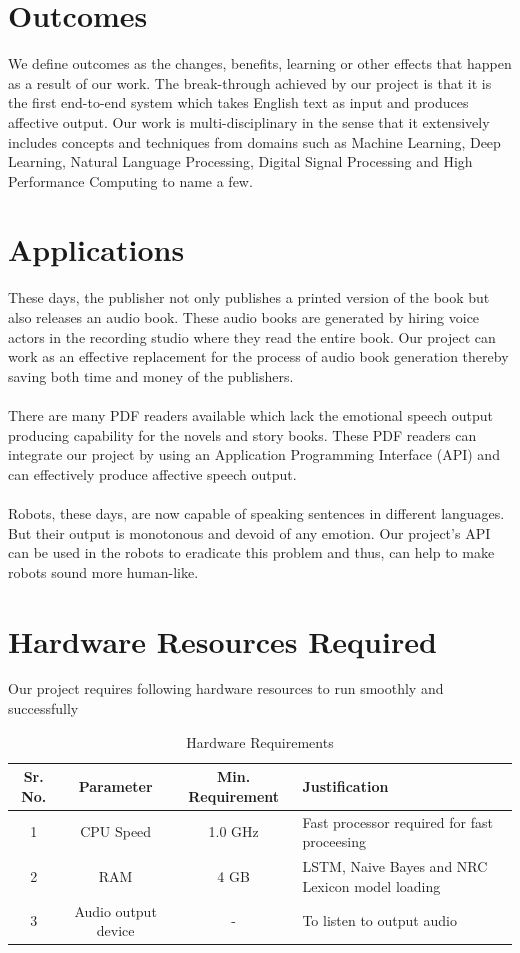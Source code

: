 \documentclass[oneside,a4paper,12pt]{book}
\begin{document}
\section{Outcomes}
 We define outcomes as the changes, benefits, learning or other effects that happen as a result of our work. The break-through achieved by our project is that it is the first end-to-end system which takes English text as input and produces affective output. Our work is multi-disciplinary in the sense that it extensively includes concepts and techniques from domains such as Machine Learning, Deep Learning, Natural Language Processing, Digital Signal Processing and High Performance Computing to name a few.

\section{Applications}
These days, the publisher not only publishes a printed version of the book but also releases an audio book. These audio books are generated by hiring voice actors in the recording studio where they read the entire book. Our project can work as an effective replacement for the process of audio book generation thereby saving both time and money of the publishers.\\\\
There are many PDF readers available which lack the emotional speech output producing capability for the novels and story books. These PDF readers can integrate our project by using an Application Programming Interface (API) and can effectively produce affective speech output.\\\\
Robots, these days, are now capable of speaking sentences in different languages. But their output is monotonous and devoid of any emotion. Our project's API can be used in the robots to eradicate this problem and thus, can help to make robots sound more human-like.

\section{Hardware Resources Required}
Our project requires following hardware resources to run smoothly and successfully 
\begin{table}[!htbp]
	\begin{center}
		\def\arraystretch{1.5}
		\begin{tabularx}{\textwidth}{| c | c | c | X |}
			\hline
			Sr. No. &	Parameter &	Min. Requirement & Justification \\
			\hline
			1 &	CPU Speed &	 1.0 GHz  & Fast processor required for fast proceesing\\
			\hline
			2 &	RAM  &	4 GB &  LSTM, Naive Bayes and NRC Lexicon model loading\\
			\hline
			3 & Audio output device & - & To listen to output audio\\
			\hline
		\end{tabularx}
		\caption { Hardware Requirements }
		\label{tab:hreq}
	\end{center}
	
\end{table}
\end{document}
